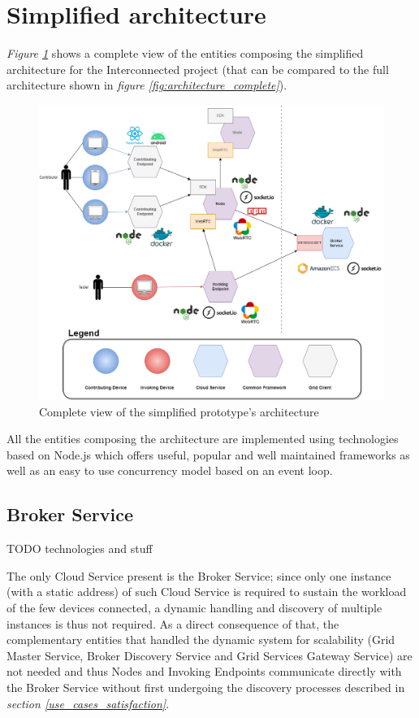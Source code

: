 \section{Simplified architecture}
\textit{Figure \ref{fig:simplified_architecture}} shows a complete view of the entities composing the simplified architecture for the Interconnected project (that can be compared to the full architecture shown in \textit{figure \ref{fig:architecture_complete}}).

\begin{figure}[!ht]
    \centering
    \includegraphics[width=\linewidth]{document/chapters/chapter_7/images/simplified_architecture.png}
    \caption{Complete view of the simplified prototype's architecture}
    \label{fig:simplified_architecture}
\end{figure}

\vspace{10mm}

All the entities composing the architecture are implemented using technologies based on Node.js which offers useful, popular and well maintained frameworks as well as an easy to use concurrency model based on an event loop.

\subsection{Broker Service}
TODO technologies and stuff

The only Cloud Service present is the Broker Service; since only one instance (with a static address) of such Cloud Service is required to sustain the workload of the few devices connected, a dynamic handling and discovery of multiple instances is thus not required. As a direct consequence of that, the complementary entities that handled the dynamic system for scalability (Grid Master Service, Broker Discovery Service and Grid Services Gateway Service) are not needed and thus Nodes and Invoking Endpoints communicate directly with the Broker Service without first undergoing the discovery processes described in \textit{section \ref{use_cases_satisfaction}}.

